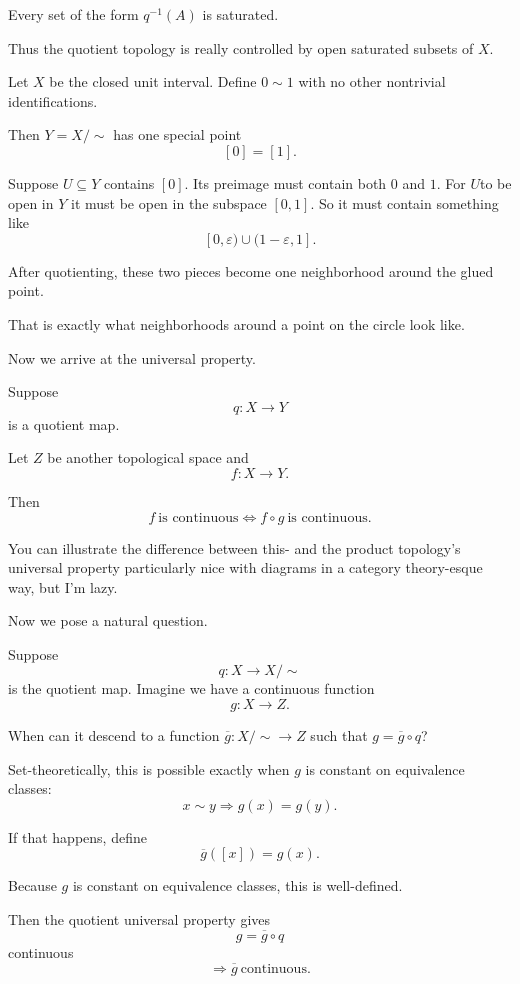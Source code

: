 \documentclass[11pt]{article}
\begin{document}
Every set of the form $q^{-1}(A)$ is saturated. 

Thus the quotient topology is really controlled by 
open saturated subsets of $X$. 

\begin{ex}
    Let $X$ be the closed unit interval. 
    Define $0 \sim 1$ with no other nontrivial identifications.

    Then $Y = X/\sim$ has one special point 
    \[
        [0] = [1]. 
    \]

    Suppose $U \subseteq Y$ contains $[0]$. 
    Its preimage must contain both $0$ and $1$. 
    For $U$to be open in $Y$ it must be open in 
    the subspace $[0,1]$. So it must contain 
    something like 
    \[
            [0,\varepsilon) \cup (1-\varepsilon, 1].
    \] 

    After quotienting, these two pieces become 
    one neighborhood around the glued point. 

    That is exactly what neighborhoods around a point 
    on the circle look like. 
\end{ex}

Now we arrive at the universal property. 

Suppose 
\[
    q : X \to Y
\]
is a quotient map. 

Let $Z$ be another topological space and 
\[
    f : X \to Y. 
\]

Then 
\[
    f \ \text{is continuous} \Leftrightarrow 
    f \circ g \ \text{is continuous}.
\]

You can illustrate the difference between 
this- and the product topology's universal property 
particularly nice with diagrams in a category theory-esque 
way, but I'm lazy. 

Now we pose a natural question. 

Suppose 
\[
    q : X \to X/\sim
\]
is the quotient map. 
Imagine we have a continuous function 
\[
    g : X \to Z.
\]

When can it descend to a function $\overline g: X/\sim \to Z$
such that $g = \overline g \circ q$? 

Set-theoretically, this is possible exactly when 
$g$ is constant on equivalence classes: 
\[
    x \sim y \Rightarrow g(x) = g(y). 
\]

If that happens, define 
\[
    \overline g([x]) = g(x). 
\]

Because $g$ is constant on equivalence classes, 
this is well-defined. 

Then the quotient universal property gives 
\[
    g = \overline g \circ q
\]
continuous 
\[
    \Rightarrow \overline g \ \text{continuous}. 
\]
\end{document}

